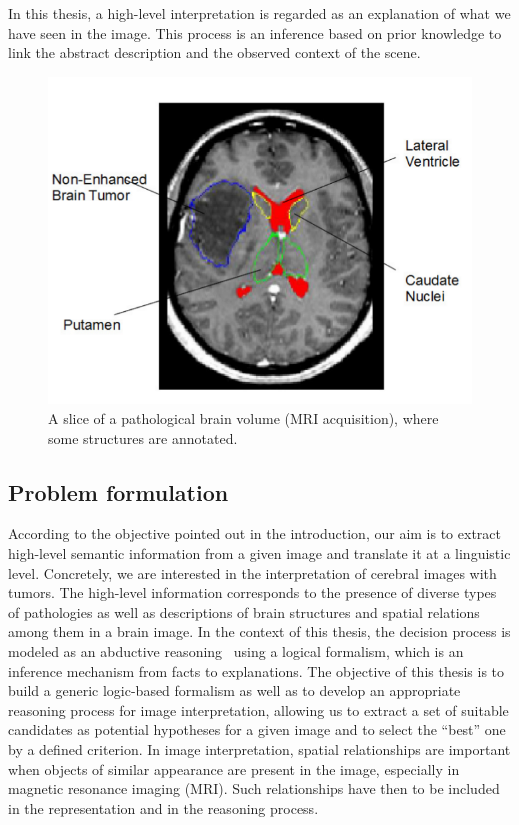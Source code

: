 \documentclass{article}
\begin{document}
 In this thesis, a high-level interpretation is regarded as an explanation of what we have seen in the image.
 This process is an inference based on  prior knowledge to link the abstract description and the observed context of the scene.
  \begin{figure}[h]
  \centering
   \includegraphics[scale=.2]{./figures/patho_brain.png}
   \caption{\label{fig:patho_brain} A slice of a pathological brain volume (MRI acquisition), where some structures are annotated.}
 \end{figure} 
\subsection{Problem formulation}
According to the objective pointed out in the introduction, our aim is to extract high-level semantic information from a given image and translate it at a linguistic level.
Concretely, we are interested in the interpretation of cerebral images with tumors. The high-level information corresponds to the presence of diverse types of pathologies
 as well as descriptions of brain structures and spatial relations among them in a brain image. 
 In the context of this thesis, the decision process is modeled as an abductive reasoning~\cite{aliseda1997seeking} using a logical formalism, 
 which is an inference mechanism from facts to explanations.
The objective of this thesis is to build a generic logic-based formalism as well as  to develop an appropriate reasoning process for image interpretation, 
 allowing us to extract a set of suitable candidates as potential hypotheses for a given image and to select the ``best'' one by a defined criterion.  
 In image interpretation, spatial relationships are important when objects of similar appearance are present in the image, especially in magnetic resonance imaging (MRI).
 Such relationships have then to be included in the representation and in the reasoning process.
  
\end{document}
